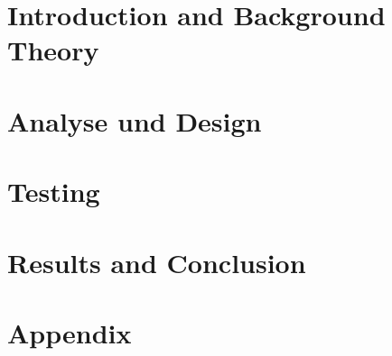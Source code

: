 
\addtolength{\evensidemargin}{-12mm}

%
%
\part[Introduction and Background Theory]{Introduction and Background Theory}
\label{part:introAndBackgroundTheory}



%
\part[Analyse und Design]{Analyse und Design}
\label{part:analysisAndDesign}




%
\part[Testing]{Testing}
\label{part:testing}


\part[Results and Conclusion]{Results and Conclusion}
\label{part:resultsAndConclusion}
 


%
%

\part*{Appendix}

\appendix %


